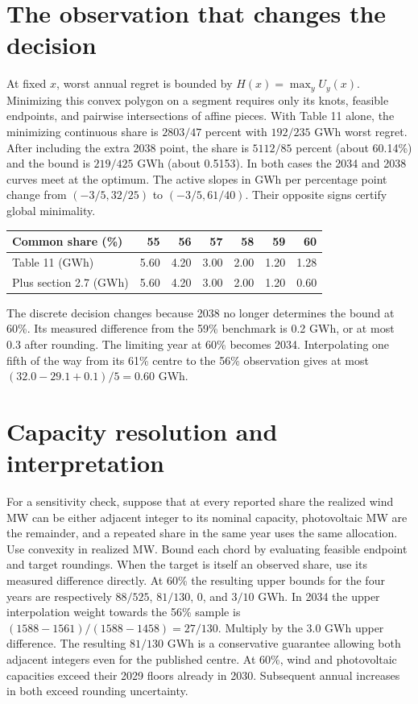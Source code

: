 \documentclass[11pt]{article}
\begin{document}
\section{The observation that changes the decision}
At fixed $x$, worst annual regret is bounded by $H(x)=\max_y U_y(x)$. Minimizing this convex polygon on a segment requires only its knots, feasible endpoints, and pairwise intersections of affine pieces. With Table 11 alone, the minimizing continuous share is $2803/47$ percent with $192/235$ GWh worst regret. After including the extra 2038 point, the share is $5112/85$ percent (about 60.14\%) and the bound is $219/425$ GWh (about 0.5153). In both cases the 2034 and 2038 curves meet at the optimum. The active slopes in GWh per percentage point change from $(-3/5,32/25)$ to $(-3/5,61/40)$. Their opposite signs certify global minimality.
\newpage
\begin{center}\small
\begin{tabular}{lrrrrrr}
\toprule
Common share (\%)&55&56&57&58&59&60\\\midrule
Table 11 (GWh)&5.60&4.20&3.00&2.00&1.20&1.28\\
Plus section 2.7 (GWh)&5.60&4.20&3.00&2.00&1.20&0.60\\\bottomrule
\end{tabular}
\end{center}
The discrete decision changes because 2038 no longer determines the bound at 60\%. Its measured difference from the 59\% benchmark is 0.2 GWh, or at most 0.3 after rounding. The limiting year at 60\% becomes 2034. Interpolating one fifth of the way from its 61\% centre to the 56\% observation gives at most $(32.0-29.1+0.1)/5=0.60$ GWh.

\section{Capacity resolution and interpretation}
For a sensitivity check, suppose that at every reported share the realized wind MW can be either adjacent integer to its nominal capacity, photovoltaic MW are the remainder, and a repeated share in the same year uses the same allocation. Use convexity in realized MW. Bound each chord by evaluating feasible endpoint and target roundings. When the target is itself an observed share, use its measured difference directly. At 60\% the resulting upper bounds for the four years are respectively $88/525$, $81/130$, $0$, and $3/10$ GWh. In 2034 the upper interpolation weight towards the 56\% sample is $(1588-1561)/(1588-1458)=27/130$. Multiply by the 3.0 GWh upper difference. The resulting $81/130$ GWh is a conservative guarantee allowing both adjacent integers even for the published centre. At 60\%, wind and photovoltaic capacities exceed their 2029 floors already in 2030. Subsequent annual increases in both exceed rounding uncertainty.
\end{document}
